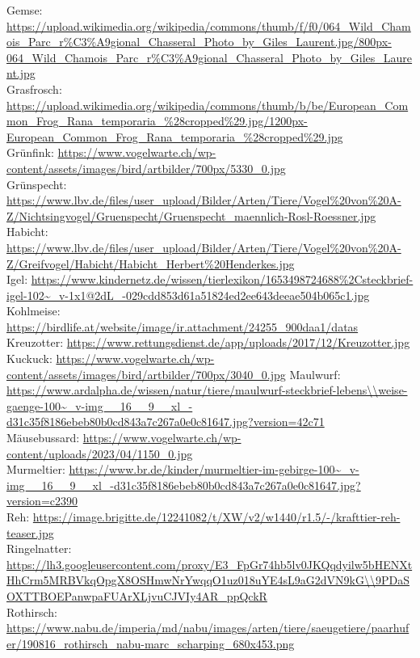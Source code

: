 Gemse: \url{https://upload.wikimedia.org/wikipedia/commons/thumb/f/f0/064_Wild_Chamois_Parc_r%C3%A9gional_Chasseral_Photo_by_Giles_Laurent.jpg/800px-064_Wild_Chamois_Parc_r%C3%A9gional_Chasseral_Photo_by_Giles_Laurent.jpg} \\
Grasfrosch: \url{https://upload.wikimedia.org/wikipedia/commons/thumb/b/be/European_Common_Frog_Rana_temporaria_%28cropped%29.jpg/1200px-European_Common_Frog_Rana_temporaria_%28cropped%29.jpg} \\
Grünfink: \url{https://www.vogelwarte.ch/wp-content/assets/images/bird/artbilder/700px/5330_0.jpg} \\
Grünspecht: \url{https://www.lbv.de/files/user_upload/Bilder/Arten/Tiere/Vogel%20von%20A-Z/Nichtsingvogel/Gruenspecht/Gruenspecht_maennlich-Rosl-Roessner.jpg} \\
Habicht: \url{https://www.lbv.de/files/user_upload/Bilder/Arten/Tiere/Vogel%20von%20A-Z/Greifvogel/Habicht/Habicht_Herbert%20Henderkes.jpg} \\
Igel: \url{https://www.kindernetz.de/wissen/tierlexikon/1653498724688%2Csteckbrief-igel-102~_v-1x1@2dL_-029cdd853d61a51824ed2ee643deeae504b065c1.jpg} \\
Kohlmeise: \url{https://birdlife.at/website/image/ir.attachment/24255_900daa1/datas} \\
Kreuzotter: \url{https://www.rettungsdienst.de/app/uploads/2017/12/Kreuzotter.jpg} \\
Kuckuck: \url{https://www.vogelwarte.ch/wp-content/assets/images/bird/artbilder/700px/3040_0.jpg} \newpage
\noindent
Maulwurf: \url{https://www.ardalpha.de/wissen/natur/tiere/maulwurf-steckbrief-lebens\\weise-gaenge-100~_v-img__16__9__xl_-d31c35f8186ebeb80b0cd843a7c267a0e0c81647.jpg?version=42c71} \\
Mäusebussard: \url{https://www.vogelwarte.ch/wp-content/uploads/2023/04/1150_0.jpg} \\
Murmeltier: \url{https://www.br.de/kinder/murmeltier-im-gebirge-100~_v-img__16__9__xl_-d31c35f8186ebeb80b0cd843a7c267a0e0c81647.jpg?version=c2390} \\
Reh: \url{https://image.brigitte.de/12241082/t/XW/v2/w1440/r1.5/-/krafttier-reh-teaser.jpg} \\
Ringelnatter: \url{https://lh3.googleusercontent.com/proxy/E3_FpGr74hb5lv0JKQqdyilw5bHENXtHhCrm5MRBVkqOpgX8OSHmwNrYwqqO1uz018uYE4sL9aG2dVN9kG\\9PDaSOXTTBOEPanwpaFUArXLjvuCJVIy4AR_ppQckR} \\
Rothirsch: \url{https://www.nabu.de/imperia/md/nabu/images/arten/tiere/saeugetiere/paarhufer/190816_rothirsch_nabu-marc_scharping_680x453.png} \\
